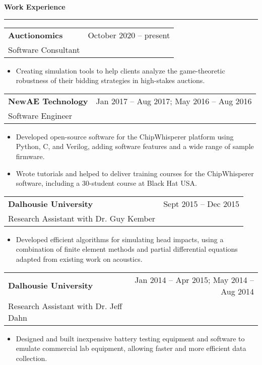 \documentclass{article}
\newcommand{\heading}[1]
{
	\vspace{3pt}
	{\bf #1} 
	\vspace{-6pt}
	
	\rule{\linewidth}{0.4pt}
}
\begin{document}
\clearpage
\heading{Work Experience}
\begin{center}
	\begin{tabularx}{\textwidth}{Xr}
		\textbf{Auctionomics}		& October 2020 -- present \\
		Software Consultant
	\end{tabularx}
	\end{center}
	\begin{itemize}
		\item Creating simulation tools to help clients analyze the game-theoretic robustness of their bidding strategies in high-stakes auctions.
	\end{itemize}

\begin{center}
\begin{tabularx}{\textwidth}{Xr}
	\textbf{NewAE Technology}		& Jan 2017 -- Aug 2017; May 2016 -- Aug 2016 \\
	Software Engineer
\end{tabularx}
\end{center}
\begin{itemize}
	\item Developed open-source software for the ChipWhisperer platform using Python, C, and Verilog, adding software features and a wide range of sample firmware.
	\item Wrote tutorials and helped to deliver training courses for the ChipWhisperer software, including a 30-student course at Black Hat USA.
\end{itemize}

\begin{center}
\begin{tabularx}{\textwidth}{Xr}
	\textbf{Dalhousie University}	& Sept 2015 -- Dec 2015 \\
	Research Assistant with Dr. Guy Kember
\end{tabularx}
\end{center}
\begin{itemize}
	\item Developed efficient algorithms for simulating head impacts, using a combination of finite element methods and partial differential equations adapted from existing work on acoustics.
\end{itemize}

\begin{center}
\begin{tabularx}{\textwidth}{Xr}
	\textbf{Dalhousie University}	& 
	Jan 2014 -- Apr 2015; May 2014 -- Aug 2014 \\
	Research Assistant with Dr. Jeff Dahn
\end{tabularx}
\end{center}
\begin{itemize}
	\item Designed and built inexpensive battery testing equipment and software to emulate commercial lab equipment, allowing faster and more efficient data collection.
\end{itemize}
\end{document}
